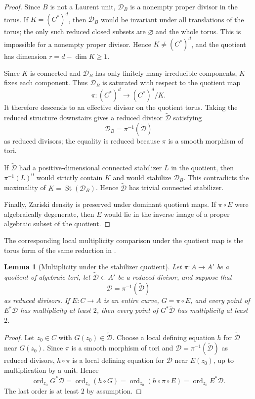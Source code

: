 \documentclass[11pt]{amsart}
\def\CC{C}%
\numberwithin{equation}{section}
\newtheorem{lemma}[theorem]{Lemma}
\theoremstyle{definition}
\theoremstyle{remark}
\newcommand{\CC}{\mathbb C}
\newcommand{\St}{\operatorname{St}}
\begin{document}
\begin{proof}
Since $B$ is not a Laurent unit, $\mathcal D_B$ is a nonempty proper divisor in the torus. If $K=(\CC^*)^d$, then $\mathcal D_B$ would be invariant under all translations of the torus; the only such reduced closed subsets are $\varnothing$ and the whole torus. This is impossible for a nonempty proper divisor. Hence $K\ne(\CC^*)^d$, and the quotient has dimension $r=d-\dim K\ge1$.

Since $K$ is connected and $\mathcal D_B$ has only finitely many irreducible components, $K$ fixes each component. Thus $\mathcal D_B$ is saturated with respect to the quotient map
\[
\pi:(\CC^*)^d\to(\CC^*)^d/K.
\]
It therefore descends to an effective divisor on the quotient torus. Taking the reduced structure downstairs gives a reduced divisor $\widetilde{\mathcal D}$ satisfying
\[
\mathcal D_B=\pi^{-1}(\widetilde{\mathcal D})
\]
as reduced divisors; the equality is reduced because $\pi$ is a smooth morphism of tori.

If $\widetilde{\mathcal D}$ had a positive-dimensional connected stabilizer $L$ in the quotient, then $\pi^{-1}(L)^0$ would strictly contain $K$ and would stabilize $\mathcal D_B$. This contradicts the maximality of $K=\St(\mathcal D_B)$. Hence $\widetilde{\mathcal D}$ has trivial connected stabilizer.

Finally, Zariski density is preserved under dominant quotient maps. If $\pi\circ E$ were algebraically degenerate, then $E$ would lie in the inverse image of a proper algebraic subset of the quotient.
\end{proof}

The corresponding local multiplicity comparison under the quotient map is the torus form of the same reduction in \cite[Propositions~3.10--3.11]{NoguchiWinkelmannYamanoi2008SMTII}.

\begin{lemma}[Multiplicity under the stabilizer quotient]\label{lem:multiplicity-quotient}
Let $\pi:A\to A'$ be a quotient of algebraic tori, let $\widetilde{\mathcal D}\subset A'$ be a reduced divisor, and suppose that
\[
\mathcal D=\pi^{-1}(\widetilde{\mathcal D})
\]
as reduced divisors.  If $E:\CC\to A$ is an entire curve, $G=\pi\circ E$, and every point of $E^*\mathcal D$ has multiplicity at least $2$, then every point of $G^*\widetilde{\mathcal D}$ has multiplicity at least $2$.
\end{lemma}

\begin{proof}
Let $z_0\in\CC$ with $G(z_0)\in\widetilde{\mathcal D}$.  Choose a local defining equation $h$ for $\widetilde{\mathcal D}$ near $G(z_0)$.  Since $\pi$ is a smooth morphism of tori and $\mathcal D=\pi^{-1}(\widetilde{\mathcal D})$ as reduced divisors, $h\circ\pi$ is a local defining equation for $\mathcal D$ near $E(z_0)$, up to multiplication by a unit.  Hence
\[
\operatorname{ord}_{z_0}G^*\widetilde{\mathcal D}
=
\operatorname{ord}_{z_0}(h\circ G)
=
\operatorname{ord}_{z_0}(h\circ\pi\circ E)
=
\operatorname{ord}_{z_0}E^*\mathcal D.
\]
The last order is at least $2$ by assumption.
\end{proof}
\end{document}
